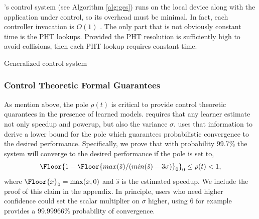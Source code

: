 \SYSTEM{}'s control system (see Algorithm \ref{alg:gcs}) runs on the
local device along with the application under control, so its overhead
must be minimal.  In fact, each controller invocation is $O(1)$ .  The
only part that is not obviously constant time is the PHT lookups.
Provided the PHT resolution is sufficiently high to avoid collisions,
then each PHT lookup requires constant time.
\begin{algorithm}[t]
\caption{Generalized control system}
\label{alg:gcs}
\end{algorithm}

\subsubsection{Control Theoretic Formal Guarantees}
\label{sec:guarantees}
As mention above, the pole $\rho(t)$ is critical to provide control
theoretic quarantees in the presence of learned models.  \SYSTEM{}
requires that any learner estimate not only speedup and powerup, but
also the variance $\sigma$.  \SYSTEM{} uses that information to derive
a lower bound for the pole which guarantees probabilistic convergence
to the desired performance. Specifically, we prove that with
probability 99.7\% the system will converge to the desired performance
if the pole is set to,
$$\Floor{1- \Floor{max(\hat{s})/(min(\hat{s}) - 3\sigma)}_0}_0 \leq \rho(t)
< 1,$$ where $\Floor{x}_0 = \max(x,0)$ and $\hat{s}$ is the
estimated speedup. We include the proof of this claim in the appendix. In principle, users who need higher confidence
could set the scalar multiplier on $\sigma$ higher, using $6$ for
example provides a 99.99966\% probability of convergence.  


